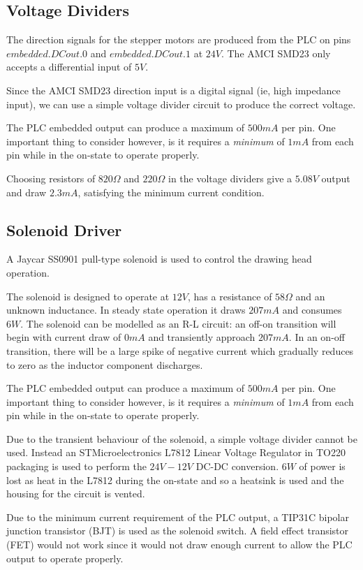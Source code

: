 	\subsection{Voltage Dividers}
		The direction signals for the stepper motors are produced from the PLC on pins $embedded.DCout.0$ and $embedded.DCout.1$ at $24V$. The AMCI SMD23 only accepts a differential input of $5V$.
		
		Since the AMCI SMD23 direction input is a digital signal (ie, high impedance input), we can use a simple voltage divider circuit to produce the correct voltage. 
		
		The PLC embedded output can produce a maximum of $500mA$ per pin. One important thing to consider however, is it requires a \emph{minimum} of $1mA$ from each pin while in the on-state to operate properly. 
		
		Choosing resistors of $820\Omega$ and $220\Omega$ in the voltage dividers give a $5.08V$ output and draw $2.3mA$, satisfying the minimum current condition. 
	\subsection{Solenoid Driver}
		A Jaycar SS0901 pull-type solenoid is used to control the drawing head operation.
		
		The solenoid is designed to operate at $12V$, has a resistance of $58\Omega$ and an unknown inductance. In steady state operation it draws $207mA$ and consumes $6W$. The solenoid can be modelled as an R-L circuit: an off-on transition will begin with current draw of $0mA$ and transiently approach $207mA$. In an on-off transition, there will be a large spike of negative current which gradually reduces to zero as the inductor component discharges.
		
		The PLC embedded output can produce a maximum of $500mA$ per pin. One important thing to consider however, is it requires a \emph{minimum} of $1mA$ from each pin while in the on-state to operate properly. 
		
		Due to the transient behaviour of the solenoid, a simple voltage divider cannot be used. Instead an STMicroelectronics L7812 Linear Voltage Regulator in TO220 packaging is used to perform the $24V-12V$ DC-DC conversion. $6W$ of power is lost as heat in the L7812 during the on-state and so a heatsink is used and the housing for the circuit is vented.
		
		Due to the minimum current requirement of the PLC output, a TIP31C bipolar junction transistor (BJT) is used as the solenoid switch. A field effect transistor (FET) would not work since it would not draw enough current to allow the PLC output to operate properly.
		
